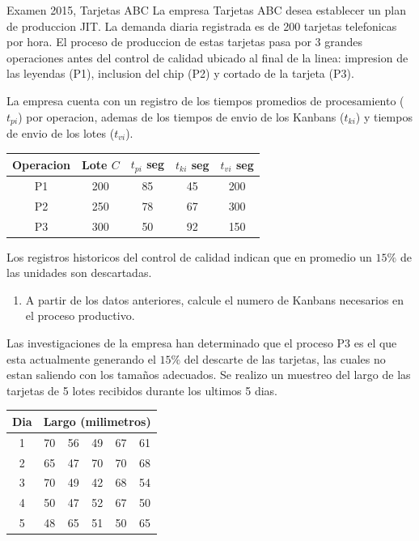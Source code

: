 \begin{enunciado}{Examen 2015, Tarjetas ABC}
La empresa Tarjetas ABC desea establecer un plan de produccion JIT. La demanda diaria registrada es de 200 tarjetas telefonicas por hora. El proceso de produccion de estas tarjetas pasa por 3 grandes operaciones antes del control de calidad ubicado al final de la linea: impresion de las leyendas (P1), inclusion del chip (P2) y cortado de la tarjeta (P3).

La empresa cuenta con un registro de los tiempos promedios de procesamiento ($t_{pi}$) por operacion, ademas de los tiempos de envio de los Kanbans ($t_{ki}$) y tiempos de envio de los lotes ($t_{vi}$).

\begin{center}
\begin{tabular}{c|cccc}
\toprule
Operacion & Lote $C$ & $t_{pi}$ seg & $t_{ki}$ seg & $t_{vi}$ seg\\
\midrule
P1 & 200 & 85 & 45 & 200\\
P2 & 250 & 78 & 67 & 300\\
P3 & 300 & 50 & 92 & 150\\
\bottomrule
\end{tabular}
\end{center}

Los registros historicos del control de calidad indican que en promedio un $15\%$ de las unidades son descartadas.

\begin{enumerate}[label=\alph*)]
  \item A partir de los datos anteriores, calcule el numero de Kanbans necesarios en el proceso productivo.
\end{enumerate}

Las investigaciones de la empresa han determinado que el proceso P3 es el que esta actualmente generando el $15\%$ del descarte de las tarjetas, las cuales no estan saliendo con los tamaños adecuados. Se realizo un muestreo del largo de las tarjetas de 5 lotes recibidos durante los ultimos 5 dias.

\begin{center}
\begin{tabular}{c|ccccc}
\toprule
Dia & \multicolumn{5}{c}{Largo (milimetros)}\\
\midrule
1 & 70 & 56 & 49 & 67 & 61\\
2 & 65 & 47 & 70 & 70 & 68\\
3 & 70 & 49 & 42 & 68 & 54\\
4 & 50 & 47 & 52 & 67 & 50\\
5 & 48 & 65 & 51 & 50 & 65\\
\bottomrule
\end{tabular}
\end{center}


\end{enunciado}
